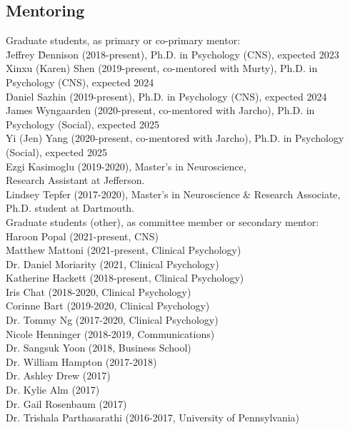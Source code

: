 \documentclass[11pt, letterpaper]{article}
\begin{document}
\subsection*{Mentoring}

\begin{tabbing}
Graduate students, as primary or co-primary mentor: \\  [.1cm]
\hspace{.5in} \= Jeffrey \= Dennison (2018-present), Ph.D. in Psychology (CNS), expected 2023 \\
\> Xinxu (Karen) Shen (2019-present, co-mentored with Murty), Ph.D. in Psychology (CNS), expected 2024 \\
\> Daniel Sazhin (2019-present), Ph.D. in Psychology (CNS), expected 2024 \\
\> James Wyngaarden (2020-present, co-mentored with Jarcho), Ph.D. in Psychology (Social), expected 2025 \\
\> Yi (Jen) Yang (2020-present, co-mentored with Jarcho), Ph.D. in Psychology (Social), expected 2025 \\
\> Ezgi Kasimoglu (2019-2020), Master's in Neuroscience, \\ 
\> \> Research Assistant at Jefferson. \\
\> Lindsey Tepfer (2017-2020), Master's in Neuroscience \& Research Associate, \\
\> \> Ph.D. student at Dartmouth. \\ [.2cm]

Graduate students (other), as committee member or secondary mentor: \\  [.1cm]
\> Haroon Popal (2021-present, CNS) \\
\> Matthew Mattoni (2021-present, Clinical Psychology) \\
\> Dr. Daniel Moriarity (2021, Clinical Psychology) \\
\> Katherine Hackett (2018-present, Clinical Psychology) \\
\> Iris Chat (2018-2020, Clinical Psychology) \\
\> Corinne Bart (2019-2020, Clinical Psychology) \\
\> Dr. Tommy Ng (2017-2020, Clinical Psychology) \\
\> Nicole Henninger (2018-2019, Communications) \\
\> Dr. Sangsuk Yoon (2018, Business School) \\
\> Dr. William Hampton (2017-2018) \\
\> Dr. Ashley Drew (2017) \\
\> Dr. Kylie Alm (2017) \\
\> Dr. Gail Rosenbaum (2017) \\
\> Dr. Trishala Parthasarathi (2016-2017, University of Pennsylvania) \\ [.2cm]


\end{tabbing}
\end{document}
